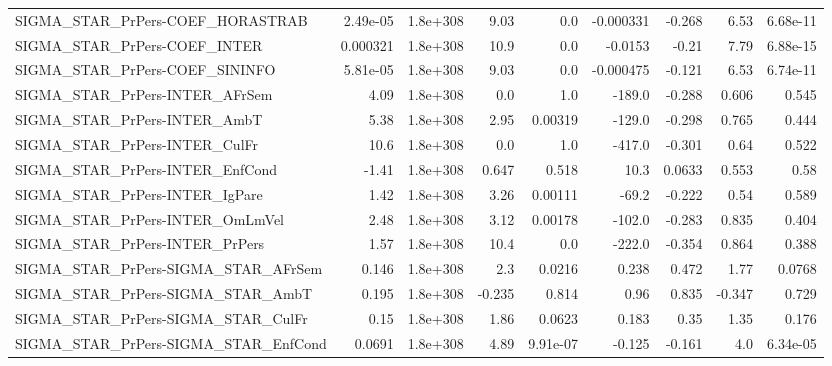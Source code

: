 \begin{tabular}{lrrrrrrrr}
SIGMA\_STAR\_PrPers-COEF\_HORASTRAB      &    2.49e-05 &     1.8e+308 &    9.03 &      0.0 &  -0.000331 &      -0.268 &         6.53 &      6.68e-11 \\
SIGMA\_STAR\_PrPers-COEF\_INTER          &    0.000321 &     1.8e+308 &    10.9 &      0.0 &    -0.0153 &       -0.21 &         7.79 &      6.88e-15 \\
SIGMA\_STAR\_PrPers-COEF\_SININFO        &    5.81e-05 &     1.8e+308 &    9.03 &      0.0 &  -0.000475 &      -0.121 &         6.53 &      6.74e-11 \\
SIGMA\_STAR\_PrPers-INTER\_AFrSem        &        4.09 &     1.8e+308 &     0.0 &      1.0 &     -189.0 &      -0.288 &        0.606 &         0.545 \\
SIGMA\_STAR\_PrPers-INTER\_AmbT          &        5.38 &     1.8e+308 &    2.95 &  0.00319 &     -129.0 &      -0.298 &        0.765 &         0.444 \\
SIGMA\_STAR\_PrPers-INTER\_CulFr         &        10.6 &     1.8e+308 &     0.0 &      1.0 &     -417.0 &      -0.301 &         0.64 &         0.522 \\
SIGMA\_STAR\_PrPers-INTER\_EnfCond       &       -1.41 &     1.8e+308 &   0.647 &    0.518 &       10.3 &      0.0633 &        0.553 &          0.58 \\
SIGMA\_STAR\_PrPers-INTER\_IgPare        &        1.42 &     1.8e+308 &    3.26 &  0.00111 &      -69.2 &      -0.222 &         0.54 &         0.589 \\
SIGMA\_STAR\_PrPers-INTER\_OmLmVel       &        2.48 &     1.8e+308 &    3.12 &  0.00178 &     -102.0 &      -0.283 &        0.835 &         0.404 \\
SIGMA\_STAR\_PrPers-INTER\_PrPers        &        1.57 &     1.8e+308 &    10.4 &      0.0 &     -222.0 &      -0.354 &        0.864 &         0.388 \\
SIGMA\_STAR\_PrPers-SIGMA\_STAR\_AFrSem   &       0.146 &     1.8e+308 &     2.3 &   0.0216 &      0.238 &       0.472 &         1.77 &        0.0768 \\
SIGMA\_STAR\_PrPers-SIGMA\_STAR\_AmbT     &       0.195 &     1.8e+308 &  -0.235 &    0.814 &       0.96 &       0.835 &       -0.347 &         0.729 \\
SIGMA\_STAR\_PrPers-SIGMA\_STAR\_CulFr    &        0.15 &     1.8e+308 &    1.86 &   0.0623 &      0.183 &        0.35 &         1.35 &         0.176 \\
SIGMA\_STAR\_PrPers-SIGMA\_STAR\_EnfCond  &      0.0691 &     1.8e+308 &    4.89 & 9.91e-07 &     -0.125 &      -0.161 &          4.0 &      6.34e-05 \\

\end{tabular}
